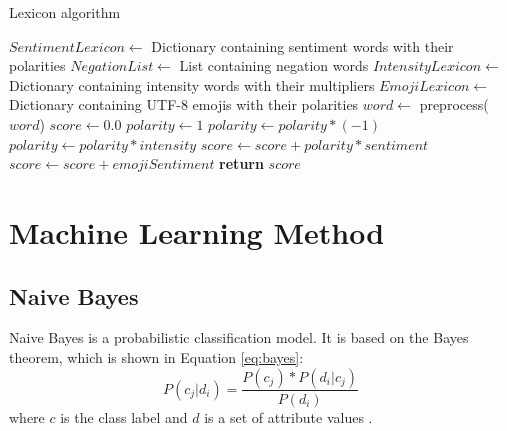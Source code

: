 \begin{algorithm}[H]
  \caption{Lexicon algorithm}\label{euclid}
    \begin{algorithmic}[1]
            \State $SentimentLexicon \gets$ Dictionary containing sentiment words with their polarities
            \State $NegationList \gets$ List containing negation words
            \State $IntensityLexicon \gets$ Dictionary containing intensity words with their multipliers
            \State $EmojiLexicon \gets$ Dictionary containing UTF-8 emojis with their polarities
                \State $word \gets$ preprocess($word$)
                \State $score \gets 0.0$
                    \State $polarity \gets 1$
                            \State $polarity \gets polarity * (-1)$
                        \Else
                                \State $polarity \gets polarity * intensity$
                            \EndIf
                        \EndIf
                    \EndFor
                    \State $score \gets score + polarity * sentiment$
                \Else
                        \State $score \gets score + emojiSentiment$
                    \EndIf
                \EndIf 
            \EndFor
            \State \textbf{return} $score$
        \EndProcedure
    \end{algorithmic}
\end{algorithm}




\section{Machine Learning Method}
    \subsection{Naive Bayes}
        Naive Bayes is a probabilistic classification model. It is based on the Bayes theorem, which is shown in Equation \eqref{eq:bayes}:
        \begin{equation}
            \label{eq:bayes}
            P(c_j|d_i) = \frac{P(c_j) * P(d_i|c_j)}{P(d_i)}
        \end{equation}
        where $c$ is the class label and $d$ is a set of attribute values \cite{DBLP:books/aw/TanSKK2019}. 
        
